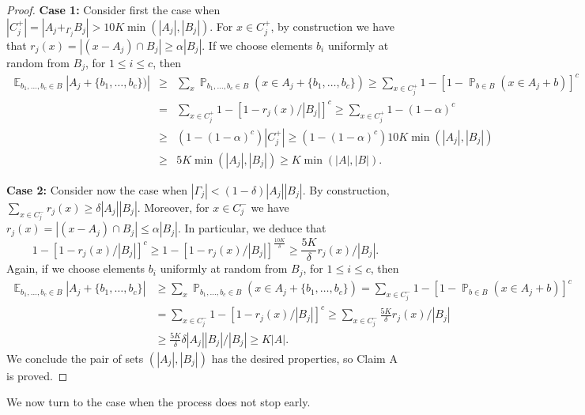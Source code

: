 \documentclass[12pt,reqno]{amsart}
\DeclareMathOperator*{\E}{\mathbb{E}}
\DeclareMathOperator*{\Prob}{\mathbb{P}}
\theoremstyle{definition}
\renewcommand\leq{\leqslant}
\renewcommand\geq{\geqslant}
\begin{document}
\begin{proof}
\vspace{7pt}
\noindent
\textbf{Case 1:} Consider first the
case when $|C^+_j|=|A_j+_{\Gamma_j}B_j|> 10K \min(|A_j|,|B_j|).$ For $x\in C_j^+$,
by construction we have that $r_j(x)=|(x-A_j)\cap B_j|\geq \alpha
|B_j|.$ If we choose elements $b_i$ uniformly at random
from $B_j$, for $1\leq i \leq c$, then
\begin{eqnarray*}
    \E_{b_1, \hdots, b_c \in B}|A_j+\{b_1, \hdots, b_c\})|
    &\geq& \sum_x \Prob_{b_1, \hdots, b_c \in B}(x \in  A_j+\{b_1, \hdots, b_c\})
      \geq \sum_{x \in C^+_j} 1-[1-\Prob_{b \in B}(x \in A_j+b)]^c\\
    &=& \sum_{x \in C^+_j} 1-[1- r_j(x)/|B_j|]^c
      \geq \sum_{x \in C^+_j} 1-(1-\alpha)^c\\
    &\geq& (1-(1-\alpha)^c) |C^+_j|
      \geq (1-(1-\alpha)^c) 10K \min(|A_j|,|B_j|) \\
    &\geq& 5K \min(|A_j|,|B_j|)
      \geq K \min(|A|,|B|).
\end{eqnarray*}

\vspace{7pt}
\noindent
\textbf{Case 2:} Consider now the case when $|\Gamma_j|<(1-\delta)|A_j||B_j|.$ By construction,
$\sum_{x\in C_j^-}r_j(x) \geq \delta|A_j||B_j|.$ Moreover, for
$x\in C_j^-$ we have $r_j(x)=|(x-A_j)\cap B_j|\leq \alpha
|B_j|.$
In particular, we deduce that
\[
1-[1- r_j(x)/|B_j|]^c \geq 1-[1- r_j(x)/|B_j|]^{\frac{10K}{\delta}} \geq \frac{5K}{\delta}r_j(x)/|B_j|.
\]
Again, if we choose elements $b_i$ uniformly at
random from $B_j$, for $1\leq i \leq c$, then
\begin{align*}
    \E_{b_1, \hdots, b_c \in B}|A_j+\{b_1, \hdots, b_c\}|
    & \geq \sum_x \Prob_{b_1, \hdots, b_c \in B}(x \in A_j+\{b_1, \hdots, b_c\})
      = \sum_{x \in C^-_j} 1-[1-\Prob_{b \in B}(x \in A_j+b)]^c\\
    & = \sum_{x \in C^-_j} 1-[1- r_j(x)/|B_j|]^c
      \geq \sum_{x \in C^-_j} \frac{5K}{\delta}r_j(x)/|B_j|\\
    & \geq \frac{5K}{\delta}\delta |A_j||B_j|/|B_j|
      \geq K|A|.
\end{align*}
We conclude the pair of sets $(|A_j|,|B_j|)$ has the desired properties, so Claim A is proved.
\end{proof}

We now turn to the case when the process does not stop early.
\end{document}
